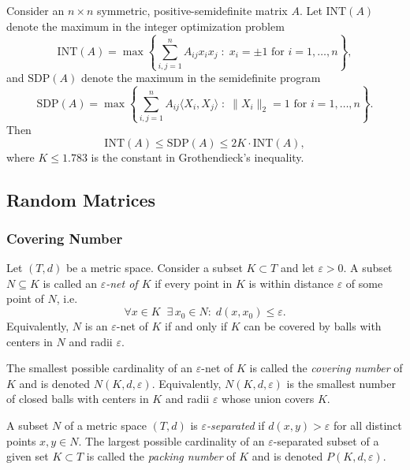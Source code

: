 \begin{thm}
Consider an $n \times n$ symmetric, positive-semidefinite matrix $A$. Let $\mathrm{INT}(A)$ denote the maximum in the integer optimization problem
\[
\mathrm{INT}(A) = \max\!\left\{ \sum_{i,j=1}^n A_{ij} x_i x_j \;:\; x_i = \pm 1 \text{ for } i = 1, \ldots, n \right\},
\]
and $\mathrm{SDP}(A)$ denote the maximum in the semidefinite program
\[
\mathrm{SDP}(A) = \max\!\left\{ \sum_{i,j=1}^n A_{ij} \langle X_i, X_j \rangle \;:\; \|X_i\|_2 = 1 \text{ for } i = 1, \ldots, n \right\}.
\]
Then
\[
\mathrm{INT}(A) \leq \mathrm{SDP}(A) \leq 2K \cdot \mathrm{INT}(A),
\]
where $K \leq 1.783$ is the constant in Grothendieck's inequality.
\end{thm}

\subsection{Random Matrices}

\subsubsection{Covering Number}
\begin{defn}
Let $(T, d)$ be a metric space. Consider a subset $K \subset T$ and let $\varepsilon > 0$. A subset $N \subseteq K$ is called an \emph{$\varepsilon$-net of $K$} if every point in $K$ is within distance $\varepsilon$ of some point of $N$, i.e.
\[
\forall x \in K \;\; \exists\, x_0 \in N : \; d(x, x_0) \leq \varepsilon.
\]
Equivalently, $N$ is an $\varepsilon$-net of $K$ if and only if $K$ can be covered by balls with centers in $N$ and radii $\varepsilon$.
\end{defn}

\begin{defn}
The smallest possible cardinality of an $\varepsilon$-net of $K$ is called the \emph{covering number} of $K$ and is denoted $N(K, d, \varepsilon)$. Equivalently, $N(K, d, \varepsilon)$ is the smallest number of closed balls with centers in $K$ and radii $\varepsilon$ whose union covers $K$.
\end{defn}

\begin{defn}
A subset $N$ of a metric space $(T, d)$ is \emph{$\varepsilon$-separated} if $d(x, y) > \varepsilon$ for all distinct points $x, y \in N$. The largest possible cardinality of an $\varepsilon$-separated subset of a given set $K \subset T$ is called the \emph{packing number} of $K$ and is denoted $P(K, d, \varepsilon)$.
\end{defn}

